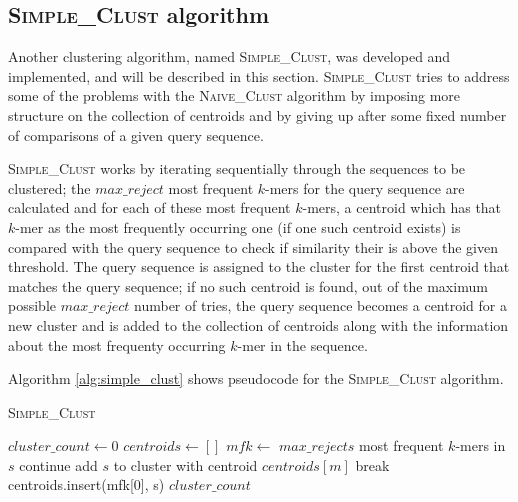 

\subsection{\textsc{Simple\_Clust} algorithm}

Another clustering algorithm, named \textsc{Simple\_Clust}, was developed and
implemented, and will be described in this section. \textsc{Simple\_Clust}
tries to address some of the problems with the \textsc{Naive\_Clust} algorithm
by imposing more structure on the collection of centroids and by giving up
after some fixed number of comparisons of a given query sequence.


\textsc{Simple\_Clust} works by iterating sequentially through the sequences to
be clustered; the $max\_reject$ most frequent $k$-mers for the query sequence
are calculated and for each of these most frequent $k$-mers, a centroid which
has that $k$-mer as the most frequently occurring one (if one such centroid
exists) is compared with the query sequence to check if similarity their is
above the given threshold. The query sequence is assigned to the cluster for
the first centroid that matches the query sequence; if no such centroid is
found, out of the maximum possible $max\_reject$ number of tries, the query
sequence becomes a centroid for a new cluster and is added to the collection of
centroids along with the information about the most frequenty occurring $k$-mer
in the sequence.  %


Algorithm \ref{alg:simple_clust} shows pseudocode for the
\textsc{Simple\_Clust} algorithm.

\begin{algorithm}
  \caption{\textsc{Simple\_Clust}}
  \label{alg:d2_naive}
  \begin{algorithmic}[1]
    \Statex
      \State $cluster\_count \gets 0$
      \State $centroids \gets []$ 
        \State $mfk \gets$ $max\_rejects$ most frequent $k$-mers in $s$
            \State continue
            \State add $s$ to cluster with centroid $centroids[m]$
            \State break
          \EndIf
        \EndFor
          \State centroids.insert(mfk[0], s)
        \EndIf
      \EndFor
      \State \Return $cluster\_count$
    \EndFunction
  \end{algorithmic}
  \label{alg:simple_clust}
\end{algorithm}


